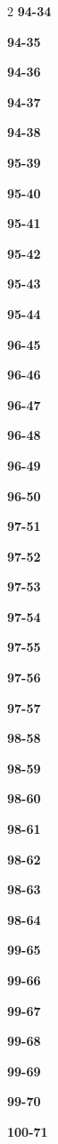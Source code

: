 \documentclass[10pt,a4paper]{article}
\begin{document}
\begin{multicols}{2}
\noindent\textbf{94-34}\ \par
\noindent\textbf{94-35}\ \par
\noindent\textbf{94-36}\ \par
\noindent\textbf{94-37}\ \par
\noindent\textbf{94-38}\ \par
\noindent\textbf{95-39}\ \par
\noindent\textbf{95-40}\ \par
\noindent\textbf{95-41}\ \par
\noindent\textbf{95-42}\ \par
\noindent\textbf{95-43}\ \par
\noindent\textbf{95-44}\ \par
\noindent\textbf{96-45}\ \par
\noindent\textbf{96-46}\ \par
\noindent\textbf{96-47}\ \par
\noindent\textbf{96-48}\ \par
\noindent\textbf{96-49}\ \par
\noindent\textbf{96-50}\ \par
\noindent\textbf{97-51}\ \par
\noindent\textbf{97-52}\ \par
\noindent\textbf{97-53}\ \par
\noindent\textbf{97-54}\ \par
\noindent\textbf{97-55}\ \par
\noindent\textbf{97-56}\ \par
\noindent\textbf{97-57}\ \par
\noindent\textbf{98-58}\ \par
\noindent\textbf{98-59}\ \par
\noindent\textbf{98-60}\ \par
\noindent\textbf{98-61}\ \par
\noindent\textbf{98-62}\ \par
\noindent\textbf{98-63}\ \par
\noindent\textbf{98-64}\ \par
\noindent\textbf{99-65}\ \par
\noindent\textbf{99-66}\ \par
\noindent\textbf{99-67}\ \par
\noindent\textbf{99-68}\ \par
\noindent\textbf{99-69}\ \par
\noindent\textbf{99-70}\ \par
\noindent\textbf{100-71}\ \par

\end{multicols}
\end{document}
